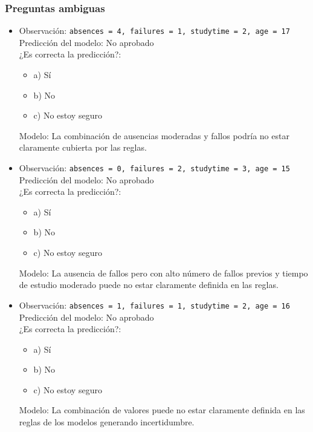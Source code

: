 \subsubsection{Preguntas ambiguas}
\begin{itemize}
    \item Observación: \texttt{absences = 4, failures = 1, studytime = 2, age = 17}\\
    Predicción del modelo: No aprobado\\
    ¿Es correcta la predicción?:
    \begin{itemize}
        \item a) Sí
        \item b) No
        \item c) No estoy seguro
    \end{itemize}
    Modelo: La combinación de ausencias moderadas y fallos podría no estar claramente cubierta por las reglas.

    \item Observación: \texttt{absences = 0, failures = 2, studytime = 3, age = 15}\\
    Predicción del modelo: No aprobado\\
    ¿Es correcta la predicción?:
    \begin{itemize}
        \item a) Sí
        \item b) No
        \item c) No estoy seguro
    \end{itemize}
    Modelo: La ausencia de fallos pero con alto número de fallos previos y tiempo de estudio moderado puede no estar claramente definida en las reglas.

    \item Observación: \texttt{absences = 1, failures = 1, studytime = 2, age = 16}\\
    Predicción del modelo: No aprobado\\
    ¿Es correcta la predicción?:
    \begin{itemize}
        \item a) Sí
        \item b) No
        \item c) No estoy seguro
    \end{itemize}
    Modelo: La combinación de valores puede no estar claramente definida en las reglas de los modelos generando incertidumbre.
\end{itemize}

